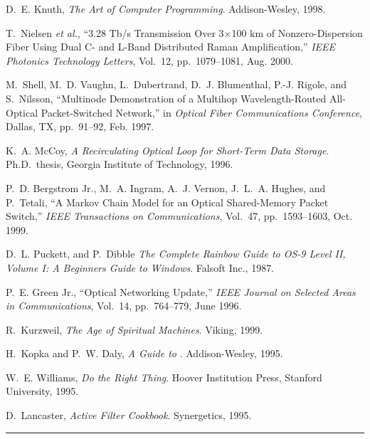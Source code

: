 \documentclass[10pt,twocolumn]{IEEEtran}
\begin{document}
\begin{thebibliography}{11}
D.~E. Knuth, {\em The Art of Computer Programming}.
\newblock Addison-Wesley, 1998.

T.~Nielsen {\em et al.}, ``3.28 Tb/s Transmission Over 3$\times$100 km of
  Nonzero-Dispersion Fiber Using Dual C- and L-Band Distributed Raman
  Amplification,'' {\em IEEE Photonics Technology Letters}, Vol.~12,
  pp.~1079--1081, Aug. 2000.

M.~Shell, M.~D. Vaughn, L.~Dubertrand, D.~J. Blumenthal, P.-J. Rigole, and
  S.~Nilsson, ``Multinode Demonstration of a Multihop Wavelength-Routed
  All-Optical Packet-Switched Network,'' in {\em Optical Fiber Communications
  Conference}, Dallas, TX, pp.~91--92, Feb. 1997.

K.~A. McCoy, {\em A Recirculating Optical Loop for Short-Term Data Storage}.
\newblock Ph.D.\ thesis, Georgia Institute of Technology, 1996.

P.~D. {Bergstrom Jr.}, M.~A. Ingram, A.~J. Vernon, J.~L.~A. Hughes, and
  P.~Tetali, ``A Markov Chain Model for an Optical Shared-Memory Packet
  Switch,'' {\em IEEE Transactions on Communications}, Vol.~47, pp.~1593--1603,
  Oct. 1999.

D.~L. Puckett, and P.~Dibble {\em The Complete Rainbow Guide to OS-9
Level II, Volume I: A Beginners Guide to Windows}.
\newblock Falsoft Inc., 1987.

P.~E. {Green Jr.}, ``Optical Networking Update,'' {\em IEEE Journal on Selected
  Areas in Communications}, Vol.~14, pp.~764--779, June 1996.

R.~Kurzweil, {\em The Age of Spiritual Machines}.
\newblock Viking, 1999.

H.~Kopka and P.~W. Daly, {\em A Guide to \LaTeXe}.
\newblock Addison-Wesley, 1995.

W.~E. Williams, {\em Do the Right Thing}.
\newblock Hoover Institution Press, Stanford University, 1995.

D.~Lancaster, {\em Active Filter Cookbook}.
\newblock Synergetics, 1995.


\end{thebibliography}
\vspace{1ex}\hrule\vspace{3ex}
\end{document}
